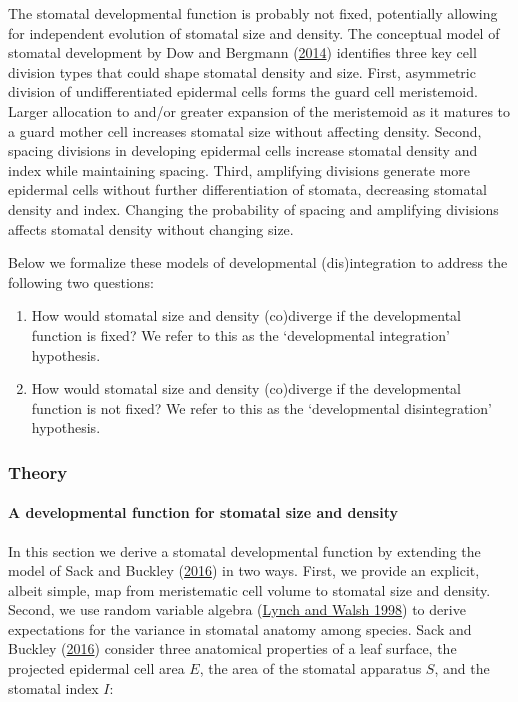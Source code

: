 \documentclass[
  12pt,
]{article}
\begin{document}
The stomatal developmental function is probably not fixed, potentially allowing for independent evolution of stomatal size and density. The conceptual model of stomatal development by Dow and Bergmann (\protect\hyperlink{ref-dow_patterning_2014}{2014}) identifies three key cell division types that could shape stomatal density and size. First, asymmetric division of undifferentiated epidermal cells forms the guard cell meristemoid. Larger allocation to and/or greater expansion of the meristemoid as it matures to a guard mother cell increases stomatal size without affecting density. Second, spacing divisions in developing epidermal cells increase stomatal density and index while maintaining spacing. Third, amplifying divisions generate more epidermal cells without further differentiation of stomata, decreasing stomatal density and index. Changing the probability of spacing and amplifying divisions affects stomatal density without changing size.

Below we formalize these models of developmental (dis)integration to address the following two questions:

\begin{enumerate}
\def\labelenumi{\arabic{enumi}.}
\item
  How would stomatal size and density (co)diverge if the developmental function is fixed? We refer to this as the `developmental integration' hypothesis.
\item
  How would stomatal size and density (co)diverge if the developmental function is not fixed? We refer to this as the `developmental disintegration' hypothesis.
\end{enumerate}

\hypertarget{theory}{%
\subsubsection{Theory}\label{theory}}

\hypertarget{a-developmental-function-for-stomatal-size-and-density}{%
\paragraph{A developmental function for stomatal size and density}\label{a-developmental-function-for-stomatal-size-and-density}}

In this section we derive a stomatal developmental function by extending the model of Sack and Buckley (\protect\hyperlink{ref-sack_developmental_2016}{2016}) in two ways. First, we provide an explicit, albeit simple, map from meristematic cell volume to stomatal size and density. Second, we use random variable algebra (\protect\hyperlink{ref-lynch_genetics_1998}{Lynch and Walsh 1998}) to derive expectations for the variance in stomatal anatomy among species. Sack and Buckley (\protect\hyperlink{ref-sack_developmental_2016}{2016}) consider three anatomical properties of a leaf surface, the projected epidermal cell area \(E\), the area of the stomatal apparatus \(S\), and the stomatal index \(I\):
\end{document}
